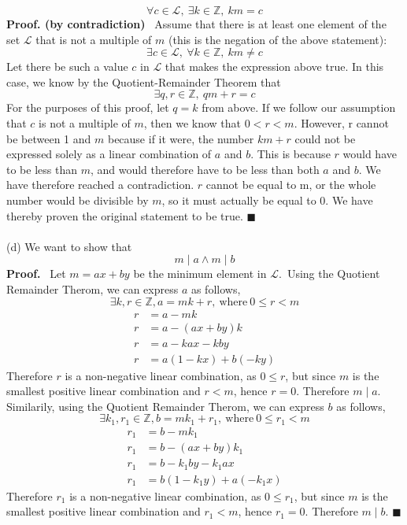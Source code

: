 \documentclass{article}
\newcommand{\Z}{\mathbb{Z}}
\begin{document}
\begin{enumerate}
	$$\forall c \in \mathcal{L},\ \exists k \in \Z,\ km = c$$ 
	\textbf{Proof. (by contradiction)} \ Assume that there is at least one element of the set $\mathcal{L}$ that is not a multiple of $m$ (this is the negation of the above statement): $$\exists c \in \mathcal{L},\ \forall k \in 
	\Z,\ km \neq c$$
	Let there be such a value $c$ in $\mathcal{L}$ that makes the expression above true. In this case, we know by the Quotient-Remainder Theorem that $$\exists q, r \in \Z,\ qm + r = c$$ 
	For the purposes of this proof, let $q = k$ from above. If we follow our assumption that $c$ is not a multiple of $m$, then we know that $0 < r < m$. However, r cannot be between 1 and $m$ because if it were, the number $km + r$ could not be expressed solely as a linear combination of $a$ and $b$. This is because $r$ would have to be less than $m$, and would therefore have to be less than both $a$ and $b$. We have therefore reached a contradiction. $r$ cannot be equal to m, or the whole number would be divisible by $m$, so it must actually be equal to 0. We have thereby proven the original statement to be true. \null\hfill $\blacksquare$ \\\\
	(d) We want to show that $$m \mid a \wedge m \mid b$$
	\textbf{Proof.} \ Let $m = ax + by$ be the minimum element in $\mathcal{L}$.\
	Using the Quotient Remainder Therom, we can express $a$ as follows, $$\exists k,r \in \Z, a = mk + r, \ \text{where}\ 0 \leq r < m$$
	\begin{align*}
	r &= a - mk\\
	r &= a - (ax + by)k\\
	r &= a - kax - kby\\
	r &= a(1- kx) + b(-ky)
	\end{align*}
	Therefore $r$ is a non-negative linear combination, as $0 \leq r$, but since $m$ is the smallest positive linear combination and $r < m$, hence $r = 0$. Therefore $m \mid a$. \\

	Similarily, using the Quotient Remainder Therom, we can express $b$ as follows, $$\exists k_1,r_1 \in \Z, b = mk_1 + r_1, \ \text{where}\ 0 \leq r_1 < m$$
	\begin{align*}
	r_1 &= b - mk_1\\
	r_1 &= b - (ax + by)k_1\\
	r_1 &= b - k_1by -  k_1ax\\
	r_1 &= b(1- k_1y) + a(-k_1x)
	\end{align*}
	Therefore $r_1$ is a non-negative linear combination, as $0 \leq r_1$, but since $m$ is the smallest positive linear combination and $r_1 < m$, hence $r_1 = 0$. Therefore $m \mid b$. \null\hfill $\blacksquare$\\\\


\end{enumerate}
\end{document}
